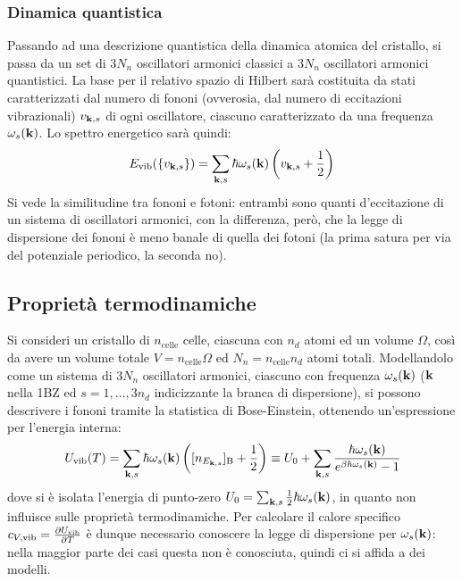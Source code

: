 \subsubsection{Dinamica quantistica}

Passando ad una descrizione quantistica della dinamica atomica del cristallo, si passa da un set di $ 3N_n $ oscillatori armonici classici a $ 3N_n $ oscillatori armonici quantistici. La base per il relativo spazio di Hilbert sarà costituita da stati caratterizzati dal numero di fononi (ovverosia, dal numero di eccitazioni vibrazionali) $ v_{\mathbf{k},s} $ di ogni oscillatore, ciascuno caratterizzato da una frequenza $ \omega_s(\mathbf{k}) $. Lo spettro energetico sarà quindi:
\begin{equation}
	E_\text{vib}(\{v_{\mathbf{k},s}\}) = \sum_{\mathbf{k},s} \hbar \omega_s(\mathbf{k}) \left( v_{\mathbf{k},s} + \frac{1}{2} \right)
\end{equation}
Si vede la similitudine tra fononi e fotoni: entrambi sono quanti d'eccitazione di un sistema di oscillatori armonici, con la differenza, però, che la legge di dispersione dei fononi è meno banale di quella dei fotoni (la prima satura per via del potenziale periodico, la seconda no).

\subsection{Proprietà termodinamiche}

Si consideri un cristallo di $ n_\text{celle} $ celle, ciascuna con $ n_d $ atomi ed un volume $ \Omega $, così da avere un volume totale $ V = n_\text{celle} \Omega $ ed $ N_n = n_\text{celle} n_d $ atomi totali. Modellandolo come un sistema di $ 3N_n $ oscillatori armonici, ciascuno con frequenza $ \omega_s(\mathbf{k}) $ ($ \mathbf{k} $ nella 1BZ ed $ s = 1, \dots, 3n_d $ indicizzante la branca di dispersione), si possono descrivere i fononi tramite la statistica di Bose-Einstein, ottenendo un'espressione per l'energia interna:
\begin{equation}
	U_\text{vib}(T) = \sum_{\mathbf{k},s} \hbar \omega_s(\mathbf{k}) \left( [n_{E_{\mathbf{k},s}}]_\text{B} + \frac{1}{2} \right) \equiv U_0 + \sum_{\mathbf{k},s} \frac{\hbar \omega_s(\mathbf{k})}{e^{\beta \hbar \omega_s(\mathbf{k})} - 1}
\end{equation}
dove si è isolata l'energia di punto-zero $ U_0 = \sum_{\mathbf{k},s} \frac{1}{2} \hbar \omega_s(\mathbf{k}) $, in quanto non influisce sulle proprietà termodinamiche. Per calcolare il calore specifico $ c_{V,\text{vib}} = \frac{\partial U_\text{vib}}{\partial T} $ è dunque necessario conoscere la legge di dispersione per $ \omega_s(\mathbf{k}) $: nella maggior parte dei casi questa non è conosciuta, quindi ci si affida a dei modelli.

